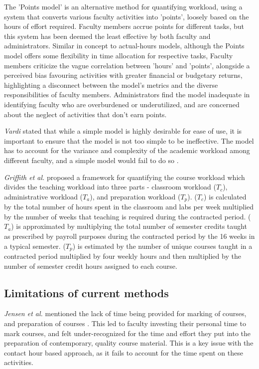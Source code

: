 \begin{enumerate}
        The 'Points model' is an alternative method for quantifying workload, using a system that converts various faculty activities into 'points', loosely based on the hours of effort required. Faculty members accrue points for different tasks, but this system has been deemed the least effective by both faculty and administrators. Similar in concept to actual-hours models, although the Points model offers some flexibility in time allocation for respective tasks, Faculty members criticize the vague correlation between 'hours' and 'points', alongside a perceived bias favouring activities with greater financial or budgetary returns, highlighting a disconnect between the model's metrics and the diverse responsibilities of faculty members. Administrators find the model inadequate in identifying faculty who are overburdened or underutilized, and are concerned about the neglect of activities that don't earn points.
\end{enumerate}


\textit{Vardi} stated that while a simple model is highly desirable for ease of use, it is important to ensure that the model is not too simple to be ineffective. The model has to account for the variance and complexity of the academic workload among different faculty, and a simple model would fail to do so \cite{vardi2009impacts}.

\textit{Griffith et al.} \cite{griffith2020framework} proposed a framework for quantifying the course workload which divides the teaching workload into three parts - classroom workload ($T_c$), administrative workload ($T_a$), and preparation workload ($T_p$). ($T_c$) is calculated by the total number of hours spent in the classroom and labs per week multiplied by the number of weeks that teaching is required during the contracted period. ($T_a$) is approximated by multiplying the total number of semester credits taught as prescribed by payroll purposes during the contracted period by the 16 weeks in a typical semester. ($T_p$) is estimated by the number of unique courses taught in a contracted period multiplied by four weekly hours and then multiplied by the number of semester credit hours assigned to each course.

\subsection{Limitations of current methods}

\textit{Jensen et al.} mentioned the lack of time being provided for marking of courses, and preparation of courses \cite{jensen2009vanishing}. This led to faculty investing their personal time to mark courses, and felt under-recognized for the time and effort they put into the preparation of contemporary, quality course material. This is a key issue with the contact hour based approach, as it fails to account for the time spent on these activities.

